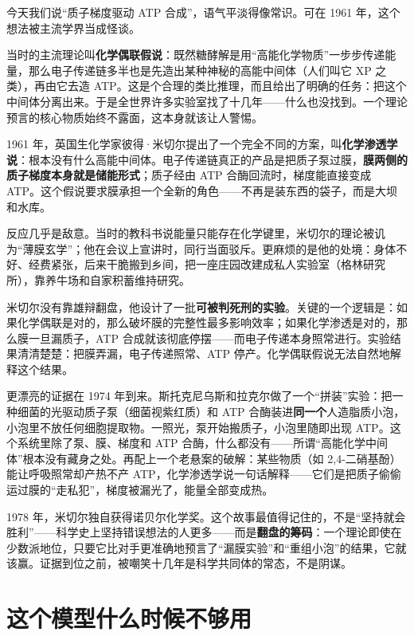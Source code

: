 \begin{zhengju}
今天我们说“质子梯度驱动 ATP 合成”，语气平淡得像常识。可在 1961 年，这个想法被主流学界当成怪谈。

当时的主流理论叫\textbf{化学偶联假说}：既然糖酵解是用“高能化学物质”一步步传递能量，那么电子传递链多半也是先造出某种神秘的高能中间体（人们叫它 X\raisebox{0.5ex}{\texttildelow}P 之类），再由它去造 ATP。这是个合理的类比推理，而且给出了明确的任务：把这个中间体分离出来。于是全世界许多实验室找了十几年——什么也没找到。一个理论预言的核心物质始终不露面，这本身就该让人警惕。

1961 年，英国生化学家彼得·米切尔提出了一个完全不同的方案，叫\textbf{化学渗透学说}：根本没有什么高能中间体。电子传递链真正的产品是把质子泵过膜，\textbf{膜两侧的质子梯度本身就是储能形式}；质子经由 ATP 合酶回流时，梯度能直接变成 ATP。这个假说要求膜承担一个全新的角色——不再是装东西的袋子，而是大坝和水库。

反应几乎是敌意。当时的教科书说能量只能存在化学键里，米切尔的理论被讥为“薄膜玄学”；他在会议上宣讲时，同行当面驳斥。更麻烦的是他的处境：身体不好、经费紧张，后来干脆搬到乡间，把一座庄园改建成私人实验室（格林研究所），靠养牛场和自家积蓄维持研究。

米切尔没有靠雄辩翻盘，他设计了一批\textbf{可被判死刑的实验}。关键的一个逻辑是：如果化学偶联是对的，那么破坏膜的完整性最多影响效率；如果化学渗透是对的，那么膜一旦漏质子，ATP 合成就该彻底停摆——而电子传递本身照常进行。实验结果清清楚楚：把膜弄漏，电子传递照常、ATP 停产。化学偶联假说无法自然地解释这个结果。

更漂亮的证据在 1974 年到来。斯托克尼乌斯和拉克尔做了一个“拼装”实验：把一种细菌的光驱动质子泵（细菌视紫红质）和 ATP 合酶装进\textbf{同一个}人造脂质小泡，小泡里不放任何细胞提取物。一照光，泵开始搬质子，小泡里随即出现 ATP。这个系统里除了泵、膜、梯度和 ATP 合酶，什么都没有——所谓“高能化学中间体”根本没有藏身之处。再配上一个老悬案的破解：某些物质（如 2,4-二硝基酚）能让呼吸照常却产热不产 ATP，化学渗透学说一句话解释——它们是把质子偷偷运过膜的“走私犯”，梯度被漏光了，能量全部变成热。

1978 年，米切尔独自获得诺贝尔化学奖。这个故事最值得记住的，不是“坚持就会胜利”——科学史上坚持错误想法的人更多——而是\textbf{翻盘的筹码}：一个理论即使在少数派地位，只要它比对手更准确地预言了“漏膜实验”和“重组小泡”的结果，它就该赢。证据到位之前，被嘲笑十几年是科学共同体的常态，不是阴谋。
\end{zhengju}

\section{这个模型什么时候不够用}

